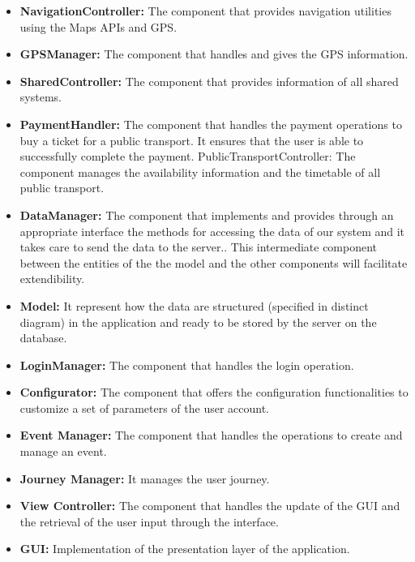 \begin{itemize}
\item
\textbf{NavigationController:} The component that provides navigation utilities using the Maps APIs and GPS.
\item
\textbf{GPSManager:} The component that handles and gives the GPS information.
\item
\textbf{SharedController:} The component that provides information of all shared systems.
\item
\textbf{PaymentHandler:} The component that handles the payment operations to buy a ticket for a public transport. It ensures that the user is able to successfully complete the payment.
PublicTransportController: The component manages the availability information and the timetable of all public transport.
\item
\textbf{DataManager:} The component that implements and provides through an appropriate interface the methods for accessing the data of our system and it takes care to send the data to the server.. This intermediate component between the entities of the the model and the other components will facilitate extendibility.
\item
\textbf{Model:} It represent how the data are structured (specified in distinct diagram) in the application and ready to be stored by the server on the database.
\item
\textbf{LoginManager:} The component that handles the login operation.
\item
\textbf{Configurator:} The component that offers the configuration functionalities
to customize a set of parameters of the user account.
\item
\textbf{Event Manager:} The component that handles the operations to create and manage an event.
\item
\textbf{Journey Manager:} It manages the user journey.
\item
\textbf{View Controller:} The component that handles the update of the GUI and the retrieval of the user input through the interface.
\item
\textbf{GUI:} Implementation of the presentation layer of the application.
\end{itemize}

